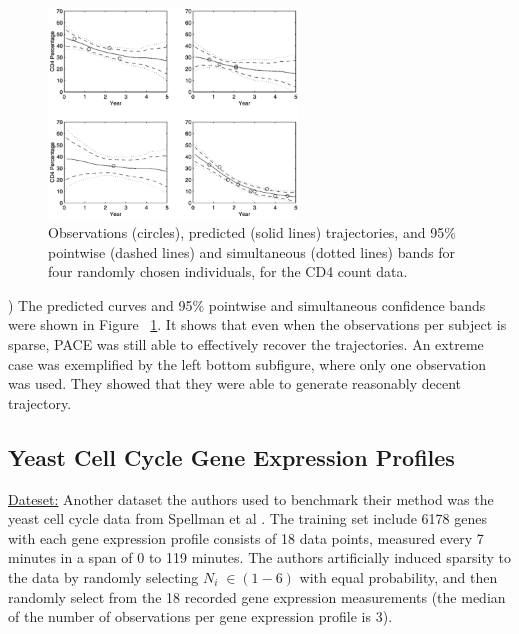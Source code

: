 \documentclass[11pt]{report}
\begin{document}
\begin{figure}
  \centering
    \includegraphics[width=0.59\textwidth]{Figures/Figure5.png}
   	\vspace{-0.5 cm}
   	\caption{Observations (circles), predicted (solid lines) trajectories, and 95\% pointwise (dashed lines) and simultaneous (dotted lines) bands for four randomly chosen individuals, for the CD4 count data.}
	\label{fig:fig5}
	\vspace{-0.7 cm}
\end{figure}

) The predicted curves and 95\% pointwise and simultaneous confidence bands were shown in Figure ~\ref{fig:fig5}.
It shows that even when the observations per subject is sparse, PACE was still able to effectively recover the trajectories. 
An extreme case was exemplified by the left bottom subfigure, where only one observation was used. 
They showed that they were able to generate reasonably decent trajectory.

\subsection*{Yeast Cell Cycle Gene Expression Profiles}
\noindent \underline{Dateset:} Another dataset the authors used to benchmark their method was the yeast cell cycle data from Spellman et al \cite{Spellman1998}. 
The training set include 6178 genes with each gene expression profile consists of 18 data points, measured every 7 minutes in a span of 0 to 119 minutes. 
The authors artificially induced sparsity to the data by randomly selecting $N_i \; \in (1 - 6)$ with equal probability, and then randomly select from the 18 recorded gene expression measurements (the median of the number of observations per gene expression profile is 3).  %

\end{document}
